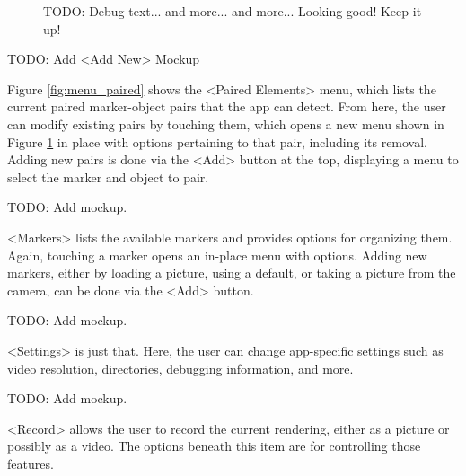 \begin{figure}
		\caption[Paired Element Pair Menu Mockup.]{TODO: Debug text... and more... and more... Looking good! Keep it up!}
		\label{fig:menu_paired_pair}
	\endminipage\hfill
\end{figure}

TODO: Add <Add New> Mockup

Figure \ref{fig:menu_paired} shows the <Paired Elements> menu, which lists the current paired marker-object pairs that the app can detect.
From here, the user can modify existing pairs by touching them, which opens a new menu shown in Figure \ref{fig:menu_paired_pair} in place with options pertaining to that pair, including its removal.
Adding new pairs is done via the <Add> button at the top, displaying a menu to select the marker and object to pair.

TODO: Add mockup.

<Markers> lists the available markers and provides options for organizing them.
Again, touching a marker opens an in-place menu with options.
Adding new markers, either by loading a picture, using a default, or taking a picture from the camera, can be done via the <Add> button.

TODO: Add mockup.

<Settings> is just that.
Here, the user can change app-specific settings such as video resolution, directories, debugging information, and more.

TODO: Add mockup.

<Record> allows the user to record the current rendering, either as a picture or possibly as a video.
The options beneath this item are for controlling those features.
